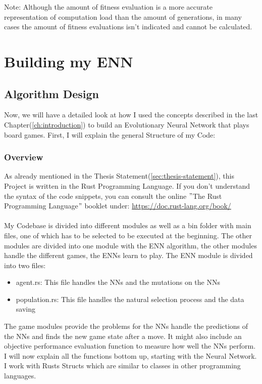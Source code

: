 \documentclass[11pt]{report}
\begin{document}
\begin{enumerate}
    Note:
    Although the amount of fitness evaluation is a more accurate representation of computation load than the amount of generations, in many cases the amount of fitness evaluations isn't indicated and cannot be calculated.

    \chapter{Building my ENN}\label{ch:building-my-enn}

    \section{Algorithm Design}\label{sec:algorithm-design}
    Now, we will have a detailed look at how I used the concepts described in the last Chapter(\ref{ch:introduction}) to build an Evolutionary Neural Network that plays board games.
    First, I will explain the general Structure of my Code:
        \subsection{Overview}\label{subsec:overview}
    As already mentioned in the Thesis Statement(\ref{sec:thesis-statement}), this Project is written in the Rust Programming Language.
    If you don't understand the syntax of the code snippets, you can consult the online \("\)The Rust Programming Language\("\) booklet under: \url{https://doc.rust-lang.org/book/}
    \\ \\
    My Codebase is divided into different modules as well as a bin folder with main files, one of which has to be selected to be executed at the beginning.
    The other modules are divided into one module with the ENN algorithm, the other modules handle the different games, the ENNs learn to play.
    The ENN module is divided into two files:
    \begin{itemize}
        \item agent.rs: This file handles the NNs and the mutations on the NNs
        \item population.rs: This file handles the natural selection process and the data saving
    \end{itemize}
    The game modules provide the problems for the NNs handle the predictions of the NNs and finds the new game state after a move.
    It might also include an objective performance evaluation function to measure how well the NNs perform.
    I will now explain all the functions bottom up, starting with the Neural Network.
    I work with Rusts Structs which are similar to classes in other programming languages.

\end{enumerate}
\end{document}
